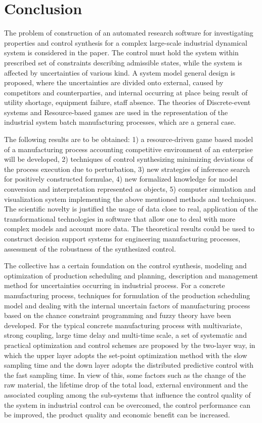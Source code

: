 \documentclass[conference]{IEEEtran}
\begin{document}
\section{Conclusion}
\label{sec:conc}

The problem of construction of an automated research software for investigating properties and control synthesis for a complex large-scale industrial dynamical system is considered in the paper.  The control must hold the system within prescribed set of constraints describing admissible states, while the system is affected by uncertainties of various kind.  A system model general design is proposed, where the uncertainties are divided onto external, caused by competitors and counterparties, and internal occurring at place being result of utility shortage, equipment failure, staff absence.  The theories of Discrete-event systems and Resource-based games are used in the representation of the industrial system batch manufacturing processes, which are a general case.

The following results are to be obtained: 1) a resource-driven game based model of a manufacturing process accounting competitive environment of an enterprise will be developed, 2) techniques of control synthesizing minimizing deviations of the process execution due to perturbation, 3) new strategies of inference search for positively constructed formulae, 4) new formalized knowledge for model conversion and interpretation represented as objects, 5) computer simulation and visualization system implementing the above mentioned methods and techniques. The scientific novelty is justified the usage of data close to real, application of the transformational technologies in software that allow one to deal with more complex models and account more data. The theoretical results could be used to construct decision support systems for engineering manufacturing processes, assessment of the robustness of the synthesized control.

The collective has a certain foundation on the control synthesis, modeling and optimization of production scheduling and planning, description and management method for uncertainties occurring in industrial process. For a concrete manufacturing process, techniques for formulation of the production scheduling model and dealing with the internal uncertain factors of manufacturing process based on the chance constraint programming and fuzzy theory \cite{b6} have been developed. For the typical concrete manufacturing process with multivariate, strong coupling, large time delay and multi-time scale, a set of systematic and practical optimization and control schemes are proposed by the two-layer way, in which the upper layer adopts the set-point optimization method with the slow sampling time and the down layer adopts the distributed predictive control with the fast sampling time. In view of this, some factors such as the change of the raw material, the lifetime drop of the total load, external environment and the associated coupling among the sub-systems that influence the control quality of the system in industrial control can be overcomed, the control performance can be improved, the product quality and economic benefit can be increased.
\end{document}
